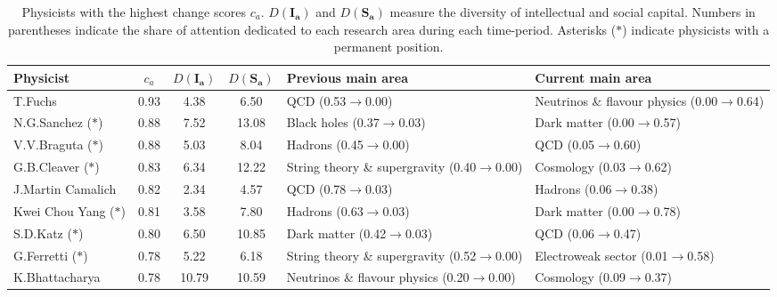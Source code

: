 \begin{table}[H]
\centering
\caption{Physicists with the highest change scores $c_a$. $D(\bm{I_a})$ and $D(\bm{S_a})$ measure the diversity of intellectual and social capital. Numbers in parentheses indicate the share of attention dedicated to each research area during each time-period. Asterisks ($\ast$) indicate physicists with a permanent position.}
\label{table:top_change}
\begin{tabular}{p{}|c|c|c|b{}|b{}}
\toprule
              Physicist & $c_a$ & $D(\bm{I_a})$ & $D(\bm{S_a})$ &                            Previous main area &                               Current main area \\
\midrule
                T.Fuchs &  0.93 &          4.38 &          6.50 &                           QCD (0.53$\to$0.00) & Neutrinos \& flavour physics (0.00$\to$0.64)\\ \hline
   N.G.Sanchez ($\ast$) &  0.88 &          7.52 &         13.08 &                   Black holes (0.37$\to$0.03) &                  Dark matter (0.00$\to$0.57)\\ \hline
   V.V.Braguta ($\ast$) &  0.88 &          5.03 &          8.04 &                       Hadrons (0.45$\to$0.00) &                          QCD (0.05$\to$0.60)\\ \hline
   G.B.Cleaver ($\ast$) &  0.83 &          6.34 &         12.22 & String theory \& supergravity (0.40$\to$0.00) &                    Cosmology (0.03$\to$0.62)\\ \hline
      J.Martin Camalich &  0.82 &          2.34 &          4.57 &                           QCD (0.78$\to$0.03) &                      Hadrons (0.06$\to$0.38)\\ \hline
Kwei Chou Yang ($\ast$) &  0.81 &          3.58 &          7.80 &                       Hadrons (0.63$\to$0.03) &                  Dark matter (0.00$\to$0.78)\\ \hline
      S.D.Katz ($\ast$) &  0.80 &          6.50 &         10.85 &                   Dark matter (0.42$\to$0.03) &                          QCD (0.06$\to$0.47)\\ \hline
    G.Ferretti ($\ast$) &  0.78 &          5.22 &          6.18 & String theory \& supergravity (0.52$\to$0.00) &           Electroweak sector (0.01$\to$0.58)\\ \hline
         K.Bhattacharya &  0.78 &         10.79 &         10.59 &  Neutrinos \& flavour physics (0.20$\to$0.00) &                    Cosmology (0.09$\to$0.37)\\ \hline

\end{tabular}
\end{table}
